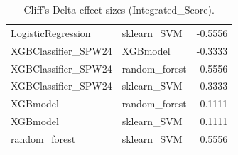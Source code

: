\begin{table}[t]
\begin{tabular}{llr}
LogisticRegression & sklearn_SVM & -0.5556 \\
XGBClassifier_SPW24 & XGBmodel & -0.3333 \\
XGBClassifier_SPW24 & random_forest & -0.5556 \\
XGBClassifier_SPW24 & sklearn_SVM & -0.3333 \\
XGBmodel & random_forest & -0.1111 \\
XGBmodel & sklearn_SVM & 0.1111 \\
random_forest & sklearn_SVM & 0.5556 \\
\bottomrule
\end{tabular}
\caption{Cliff's Delta effect sizes (Integrated_Score).}
\label{tab:cliffs_Integrated_Score}
\end{table}